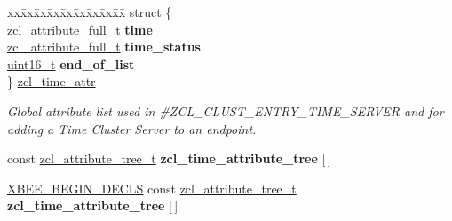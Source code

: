 \begin{DoxyCompactItemize}
\item 
\begin{tabbing}
xx\=xx\=xx\=xx\=xx\=xx\=xx\=xx\=xx\=\kill
struct \{\\
\>\hyperlink{structzcl__attribute__full__t}{zcl\_attribute\_full\_t} {\bfseries time}\\
\>\hyperlink{structzcl__attribute__full__t}{zcl\_attribute\_full\_t} {\bfseries time\_status}\\
\>\hyperlink{group__hal__dos_ga5a8b2dc9e45a9ee81a94ef304fb62505}{uint16\_t} {\bfseries end\_of\_list}\\
\} \hyperlink{group__zcl__time_gad6a3c9d4f109933785ddc31101dabdc1}{zcl\_time\_attr}\\

\end{tabbing}\begin{DoxyCompactList}\small\item\em Global attribute list used in \#\+Z\+C\+L\+\_\+\+C\+L\+U\+S\+T\+\_\+\+E\+N\+T\+R\+Y\+\_\+\+T\+I\+M\+E\+\_\+\+S\+E\+R\+V\+ER and for adding a Time Cluster Server to an endpoint. \end{DoxyCompactList}\item 
const \hyperlink{structzcl__attribute__tree__t}{zcl\+\_\+attribute\+\_\+tree\+\_\+t} {\bfseries zcl\+\_\+time\+\_\+attribute\+\_\+tree} \mbox{[}$\,$\mbox{]}
\item 
\mbox{\label{group__zcl__time_ga926f1bfd80ed5a894abfc872a292c556}} 
\hyperlink{group__hal_ga336bff4f4a6012aacc4468132bbd3d7f}{X\+B\+E\+E\+\_\+\+B\+E\+G\+I\+N\+\_\+\+D\+E\+C\+LS} const \hyperlink{structzcl__attribute__tree__t}{zcl\+\_\+attribute\+\_\+tree\+\_\+t} {\bfseries zcl\+\_\+time\+\_\+attribute\+\_\+tree} \mbox{[}$\,$\mbox{]}
\end{DoxyCompactItemize}
\label{_amgrp01747264fe7bf50731df0522c351974e}%
